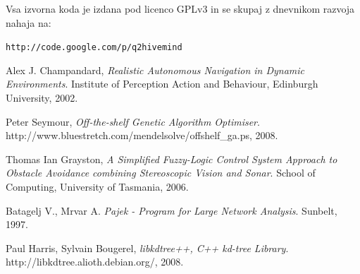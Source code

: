 \documentclass[a4paper,10pt]{article}
\begin{document}
Vsa izvorna koda je izdana pod licenco GPLv3 in se skupaj z dnevnikom razvoja nahaja na:

\begin{center}
\texttt{http://code.google.com/p/q2hivemind}
\end{center}

%
%
\begin{thebibliography}{9}

  Alex J. Champandard,
  \emph{Realistic Autonomous Navigation in Dynamic Environments}.
  Institute of Perception Action and Behaviour,
  Edinburgh University,
  2002.

  Peter Seymour,
  \emph{Off-the-shelf Genetic Algorithm Optimiser}.
  http://www.bluestretch.com/mendelsolve/offshelf\_ga.ps,
  2008.

  Thomas Ian Grayston,
  \emph{A Simplified Fuzzy-Logic Control System Approach to Obstacle Avoidance combining Stereoscopic Vision and Sonar}.
  School of Computing,
  University of Tasmania,
  2006.

  Batagelj V., Mrvar A.
  \emph{Pajek - Program for Large Network Analysis}.
  Sunbelt,
  1997.

  Paul Harris, Sylvain Bougerel,
  \emph{libkdtree++, C++ kd-tree Library}.
  http://libkdtree.alioth.debian.org/,
  2008.

\end{thebibliography}
\end{document}
